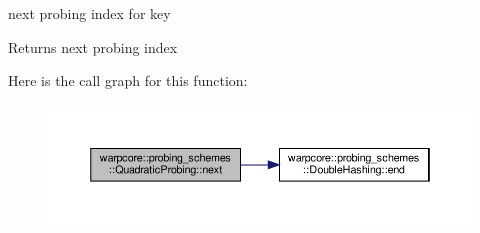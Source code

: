 next probing index for {\ttfamily key} 

\begin{DoxyReturn}{Returns}
next probing index 
\end{DoxyReturn}
Here is the call graph for this function\+:
\nopagebreak
\begin{figure}[H]
\begin{center}
\leavevmode
\includegraphics[width=350pt]{classwarpcore_1_1probing__schemes_1_1QuadraticProbing_ad19ec9917173a2e4a1381f8848a367b8_cgraph}
\end{center}
\end{figure}
